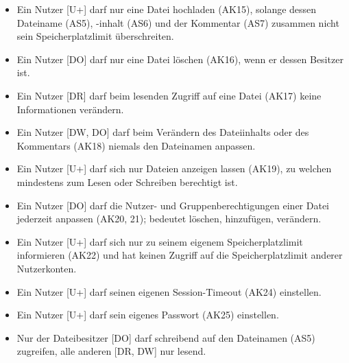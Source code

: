 \documentclass[fontsize=12pt,DIV=14,BCOR=10mm,a4paper,parskip=half-,headsepline,headinclude,english,ngerman,bibliography=totocnumbered]{scrreprt}
\begin{document}
\begin{itemize}
  \item Ein Nutzer [U+] darf nur eine Datei hochladen (AK15), solange dessen Dateiname (AS5), -inhalt (AS6) und der Kommentar (AS7) zusammen nicht sein Speicherplatzlimit überschreiten.
  \item Ein Nutzer [DO] darf nur eine Datei löschen (AK16), wenn er dessen Besitzer ist.
  \item Ein Nutzer [DR] darf beim lesenden Zugriff auf eine Datei (AK17) keine Informationen verändern.
  \item Ein Nutzer [DW, DO] darf beim Verändern des Dateiinhalts oder des Kommentars (AK18) niemals den Dateinamen anpassen.
  \item Ein Nutzer [U+] darf sich nur Dateien anzeigen lassen (AK19), zu welchen mindestens zum Lesen oder Schreiben berechtigt ist.
  \item Ein Nutzer [DO] darf die Nutzer- und Gruppenberechtigungen einer Datei jederzeit anpassen (AK20, 21); bedeutet löschen, hinzufügen, verändern.
  \item Ein Nutzer [U+] darf sich nur zu seinem eigenem Speicherplatzlimit informieren (AK22) und hat keinen Zugriff auf die Speicherplatzlimit anderer Nutzerkonten.
  \item Ein Nutzer [U+] darf seinen eigenen Session-Timeout (AK24) einstellen.
  \item Ein Nutzer [U+] darf sein eigenes Passwort (AK25) einstellen.
  \item Nur der Dateibesitzer [DO] darf schreibend auf den Dateinamen (AS5) zugreifen, alle anderen [DR, DW] nur lesend.
\end{itemize}

\printbibliography

\printacronyms[title=Abkürzungsverzeichnis,toctitle=Abkürzungsverzeichnis]
\printglossary[title=Glossar,toctitle=Glossar,type=main]

\iftotalfigures
  \listoffigures
\fi
\end{document}

